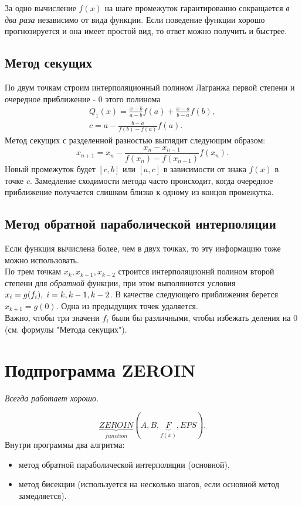 \documentclass[a4paper,11pt]{article}
\begin{document}
\noindent За одно вычисление $f(x)$ на шаге промежуток гарантированно сокращается \textit{в два раза} независимо от вида функции.
Если поведение функции хорошо прогнозируется и она имеет простой вид, то ответ можно получить и быстрее.

\subsection{Метод секущих}
По двум точкам строим интерполяционный полином Лагранжа первой степени и очередное приближение - $0$ этого полинома
\begin{gather*}
  Q_1(x) = \frac{x-b}{a-b}f(a) + \frac{x-a}{b-a}f(b), \\
  c = a - \frac{b-a}{f(b)-f(a)}f(a).
\end{gather*}
Метод секущих с разделенной разностью выглядит следующим образом:
\begin{equation*}
  x_{n+1} = x_n - \frac{x_n-x_{n-1}}{f(x_n)-f(x_{n-1})}f(x_n).
\end{equation*}
Новый промежуток будет $[c, b]$ или $[a, c]$ в зависимости от знака $f(x)$ в точке $c$. Замедление сходимости метода часто происходит,
когда очередное приближение получается слишком близко к одному из концов промежутка.

\subsection{Метод обратной параболической интерполяции}
Если функция вычислена более, чем в двух точках, то эту информацию тоже можно использовать. \\

\noindent По трем точкам $x_k,x_{k-1},x_{k-2}$ строится интерполяционнй полином второй степени для \textit{обратной} функции,
при этом выполянются условия \\$x_i=g(f_i), \hspace{1mm} i =k, k-1, k-2$. В качестве следующего приближения берется $x_{k+1}=g(0)$.
Одна из предыдущих точек удаляется. \\

\noindent Важно, чтобы три значени $f_i$ были бы различными, чтобы избежать деления на $0$ (см. формулы "Метода секущих").

\section{Подпрограмма ZEROIN}
\begin{flushright}
  \textit{Всегда работает хорошо.}
\end{flushright}
\begin{equation*}
  \underbrace{ZEROIN}_{function}(A, B, \underbrace{F}_{f(x)}, EPS).
\end{equation*}
Внутри программы два алгритма:
\begin{itemize}
  \item метод обратной параболической интерполяции (основной),
  \item метод бисекции (используется на несколько шагов, если основной метод замедляется).
\end{itemize}
\end{document}
